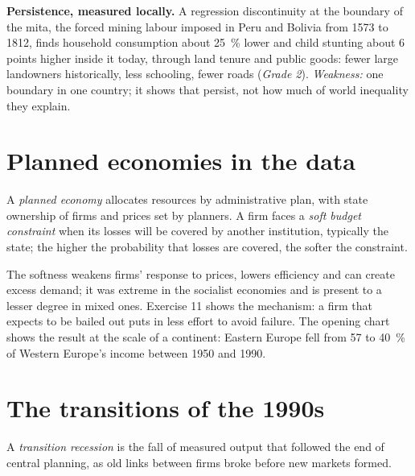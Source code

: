 \begin{debate}
\textbf{Persistence, measured locally.} A regression discontinuity at the boundary of
the mita, the forced mining labour imposed in Peru and Bolivia from 1573 to 1812, finds household
consumption about 25~\% lower and child stunting about 6 points higher inside it today, through land
tenure and public goods: fewer large landowners historically, less schooling, fewer
roads (\emph{Grade 2}). %
\emph{Weakness:} one boundary in one country; it shows that  persist, not
how much of world inequality they explain.
\end{debate}

\section{Planned economies in the data}\label{sec:b3:institutions:planned}

\begin{definition}\label{def:b3:institutions:planned}
A \emph{planned economy} allocates resources by administrative plan, with state
ownership of firms and prices set by planners. A firm faces a \emph{soft budget
constraint} when its losses will be covered by another institution, typically the
state; the higher the probability that losses are covered, the softer the constraint. %
\end{definition}

The softness weakens firms' response to prices, lowers efficiency and can create
excess demand; it was extreme in the socialist economies and is present to a lesser
degree in mixed ones. %
Exercise 11 shows the mechanism: a firm that expects to be bailed out puts in less
effort to avoid failure. The opening chart shows the result at the scale of a
continent: Eastern Europe fell from 57 to 40~\% of Western Europe's income between 1950 and 1990.

\section{The transitions of the 1990s}\label{sec:b3:institutions:transition}

\begin{definition}\label{def:b3:institutions:transition}
A \emph{transition recession} is the fall of measured output that followed the end of
central planning, as old links between firms broke before new markets formed.
\end{definition}

